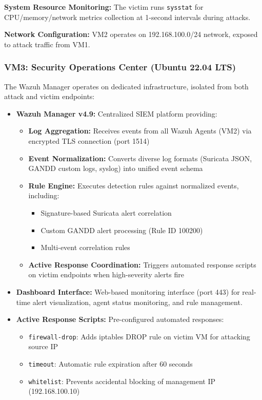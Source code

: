 \textbf{System Resource Monitoring:} The victim runs \texttt{sysstat} for CPU/memory/network metrics collection at 1-second intervals during attacks.

\textbf{Network Configuration:} VM2 operates on 192.168.100.0/24 network, exposed to attack traffic from VM1.

\subsubsection{VM3: Security Operations Center (Ubuntu 22.04 LTS)}

The Wazuh Manager operates on dedicated infrastructure, isolated from both attack and victim endpoints:

\begin{itemize}
    \item \textbf{Wazuh Manager v4.9:} Centralized SIEM platform providing:
    \begin{itemize}
        \item \textbf{Log Aggregation:} Receives events from all Wazuh Agents (VM2) via encrypted TLS connection (port 1514)
        \item \textbf{Event Normalization:} Converts diverse log formats (Suricata JSON, GANDD custom logs, syslog) into unified event schema
        \item \textbf{Rule Engine:} Executes detection rules against normalized events, including:
        \begin{itemize}
            \item Signature-based Suricata alert correlation
            \item Custom GANDD alert processing (Rule ID 100200)
            \item Multi-event correlation rules
        \end{itemize}
        \item \textbf{Active Response Coordination:} Triggers automated response scripts on victim endpoints when high-severity alerts fire
    \end{itemize}
    
    \item \textbf{Dashboard Interface:} Web-based monitoring interface (port 443) for real-time alert visualization, agent status monitoring, and rule management.
    
    \item \textbf{Active Response Scripts:} Pre-configured automated responses:
    \begin{itemize}
        \item \texttt{firewall-drop}: Adds iptables DROP rule on victim VM for attacking source IP
        \item \texttt{timeout}: Automatic rule expiration after 60 seconds
        \item \texttt{whitelist}: Prevents accidental blocking of management IP (192.168.100.10)
    \end{itemize}
    

\end{itemize}
